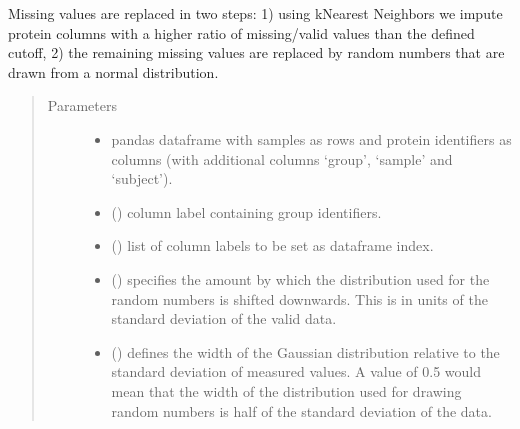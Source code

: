 \documentclass[letterpaper,10pt,english]{sphinxmanual}
\begin{document}
\begin{fulllineitems}
\label{\detokenize{_autosummary/analytics_core.analytics:analytics_core.analytics.analytics.imputation_mixed_norm_KNN}}
Missing values are replaced in two steps: 1) using k\sphinxhyphen{}Nearest Neighbors we impute protein columns with a higher ratio of missing/valid values than the defined cutoff,     2) the remaining missing values are replaced by random numbers that are drawn from a normal distribution.
\begin{quote}\begin{description}
\item[{Parameters}] \leavevmode\begin{itemize}
\item {} 
 \textendash{} pandas dataframe with samples as rows and protein identifiers as columns (with additional columns ‘group’, ‘sample’ and ‘subject’).

\item {} 
 () \textendash{} column label containing group identifiers.

\item {} 
 () \textendash{} list of column labels to be set as dataframe index.

\item {} 
 () \textendash{} specifies the amount by which the distribution used for the random numbers is shifted downwards. This is in units of the                         standard deviation of the valid data.

\item {} 
 () \textendash{} defines the width of the Gaussian distribution relative to the standard deviation of measured values.                         A value of 0.5 would mean that the width of the distribution used for drawing random numbers is half of the standard deviation of the data.


\end{itemize}
\end{description}
\end{quote}
\end{fulllineitems}
\end{document}
